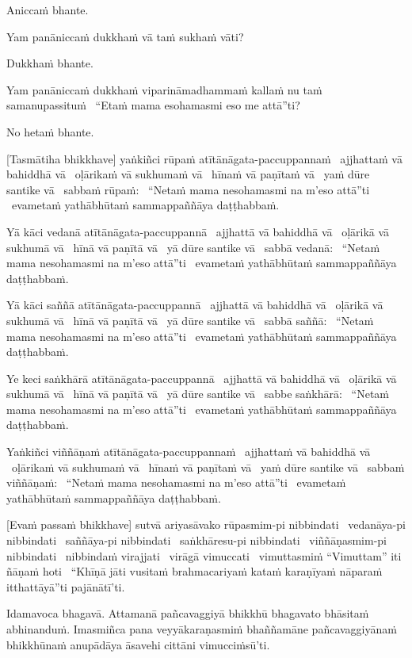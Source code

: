 Aniccaṁ bhante.

Yam panāniccaṁ dukkhaṁ vā taṁ sukhaṁ vāti?

Dukkhaṁ bhante.

Yam panāniccaṁ dukkhaṁ viparināmadhammaṁ kallaṁ nu taṁ samanupassituṁ \breathmark\ “Etaṁ mama esohamasmi eso me attā”ti?

No hetaṁ bhante.

[Tasmātiha bhikkhave] yaṅkiñci rūpaṁ atītānāgata-paccuppannaṁ \breathmark\ ajjhattaṁ vā bahiddhā vā \breathmark\ oḷārikaṁ vā sukhumaṁ vā \breathmark\ hīnaṁ vā paṇītaṁ vā \breathmark\ yaṁ dūre santike vā \breathmark\ sabbaṁ rūpaṁ: \breathmark\ “Netaṁ mama nesohamasmi na m’eso attā”ti \breathmark\ evametaṁ yathābhūtaṁ sammappaññāya daṭṭhabbaṁ.

Yā kāci vedanā atītānāgata-paccuppannā \breathmark\ ajjhattā vā bahiddhā vā \breathmark\ oḷārikā vā sukhumā vā \breathmark\ hīnā vā paṇītā vā \breathmark\ yā dūre santike vā \breathmark\ sabbā vedanā: \breathmark\ “Netaṁ mama nesohamasmi na m’eso attā”ti \breathmark\ evametaṁ yathābhūtaṁ sammappaññāya daṭṭhabbaṁ.

Yā kāci saññā atītānāgata-paccuppannā \breathmark\ ajjhattā vā bahiddhā vā \breathmark\ oḷārikā vā sukhumā vā \breathmark\ hīnā vā paṇītā vā \breathmark\ yā dūre santike vā \breathmark\ sabbā saññā: \breathmark\ “Netaṁ mama nesohamasmi na m’eso attā”ti \breathmark\ evametaṁ yathābhūtaṁ sammappaññāya daṭṭhabbaṁ.

Ye keci saṅkhārā atītānāgata-paccuppannā \breathmark\ ajjhattā vā bahiddhā vā \breathmark\ oḷārikā vā sukhumā vā \breathmark\ hīnā vā paṇītā vā \breathmark\ yā dūre santike vā \breathmark\ sabbe saṅkhārā: \breathmark\ “Netaṁ mama nesohamasmi na m’eso attā”ti \breathmark\ evametaṁ yathābhūtaṁ sammappaññāya daṭṭhabbaṁ.

Yaṅkiñci viññāṇaṁ atītānāgata-paccuppannaṁ \breathmark\ ajjhattaṁ vā bahiddhā vā \breathmark\ oḷārikaṁ vā sukhumaṁ vā \breathmark\ hīnaṁ vā paṇītaṁ vā \breathmark\ yaṁ dūre santike vā \breathmark\ sabbaṁ viññāṇaṁ: \breathmark\ “Netaṁ mama nesohamasmi na m’eso attā”ti \breathmark\ evametaṁ yathābhūtaṁ sammappaññāya daṭṭhabbaṁ.

[Evaṁ passaṁ bhikkhave] sutvā ariyasāvako rūpasmim-pi nibbindati \breathmark\ vedanāya-pi nibbindati \breathmark\ saññāya-pi nibbindati \breathmark\ saṅkhāresu-pi nibbindati \breathmark\ viññāṇasmim-pi nibbindati \breathmark\ nibbindaṁ virajjati \breathmark\ virāgā vimuccati \breathmark\ vimuttasmiṁ “Vimuttam” iti ñāṇaṁ hoti \breathmark\ “Khīṇā jāti vusitaṁ brahmacariyaṁ kataṁ karaṇīyaṁ nāparaṁ itthattāyā”ti pajānātī’ti.

Idamavoca bhagavā. Attamanā pañcavaggiyā bhikkhū bhagavato bhāsitaṁ abhinanduṁ. Imasmiñca pana veyyākaraṇasmiṁ bhaññamāne pañcavaggiyānaṁ bhikkhūnaṁ anupādāya āsavehi cittāni vimucciṁsū’ti.

\suttaRef{[SN 22.59]}
